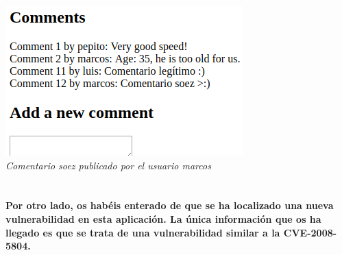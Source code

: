 \documentclass[10pt,a4paper]{article}
\begin{document}
\begin{enumerate}
\begin{center}
\includegraphics[scale=0.6]{form5.png}\\
\textit{Comentario soez publicado por el usuario marcos}
\end{center}

\end{enumerate}

\section{}
\textbf{Por otro lado, os habéis enterado de que se ha localizado una nueva vulnerabilidad en esta
aplicación. La única información que os ha llegado es que se trata de una vulnerabilidad
similar a la CVE-2008-5804.}
\end{document}
